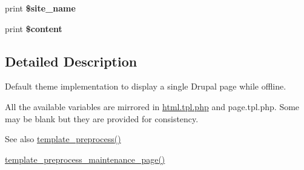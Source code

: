 \begin{DoxyCompactItemize}
\item 
\hypertarget{modules_2system_2maintenance-page_8tpl_8php_ad500e3900e86a2e78f15afbe44b1f849}{
print {\bfseries \$site\_\-name}}
\label{modules_2system_2maintenance-page_8tpl_8php_ad500e3900e86a2e78f15afbe44b1f849}

\item 
\hypertarget{modules_2system_2maintenance-page_8tpl_8php_ab7b7210f43aa78e34f0b202de894a74c}{
print {\bfseries \$content}}
\label{modules_2system_2maintenance-page_8tpl_8php_ab7b7210f43aa78e34f0b202de894a74c}

\end{DoxyCompactItemize}


\subsection{Detailed Description}
Default theme implementation to display a single Drupal page while offline.

All the available variables are mirrored in \hyperlink{html_8tpl_8php}{html.tpl.php} and page.tpl.php. Some may be blank but they are provided for consistency.

\begin{DoxySeeAlso}{See also}
\hyperlink{includes_2theme_8inc_a3eeb7bcdba7ef4859f99586da264d347}{template\_\-preprocess()} 

\hyperlink{includes_2theme_8inc_a14a92df5f5e74cebcf7fb680885e58a5}{template\_\-preprocess\_\-maintenance\_\-page()} 
\end{DoxySeeAlso}
